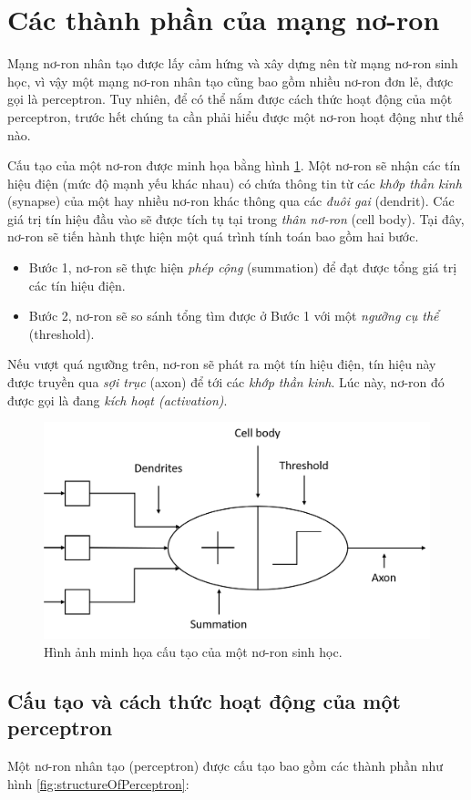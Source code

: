 \section{Các thành phần của mạng nơ-ron}
Mạng nơ-ron nhân tạo được lấy cảm hứng và xây dựng nên từ mạng nơ-ron sinh học, vì vậy một mạng nơ-ron nhân tạo cũng bao gồm nhiều nơ-ron đơn lẻ, được gọi là perceptron. Tuy nhiên, để có thể nắm được cách thức hoạt động của một perceptron, trước hết chúng ta cần phải hiểu được một nơ-ron hoạt động như thế nào.

Cấu tạo của một nơ-ron được minh họa bằng hình \ref{fig:structureOfNeuron}. Một nơ-ron sẽ nhận các tín hiệu điện (mức độ mạnh yếu khác nhau) có chứa thông tin từ các \textit{khớp thần kinh} (synapse) của một hay nhiều nơ-ron khác thông qua các \textit{đuôi gai} (dendrit). Các giá trị tín hiệu đầu vào sẽ được tích tụ tại trong \textit{thân nơ-ron} (cell body). Tại đây, nơ-ron sẽ tiến hành thực hiện một quá trình tính toán bao gồm hai bước.
\begin{itemize}
\item Bước 1, nơ-ron sẽ thực hiện \textit{phép cộng} (summation) để đạt được tổng giá trị các tín hiệu điện.
\item Bước 2, nơ-ron sẽ so sánh tổng tìm được ở Bước 1 với một \textit{ngưỡng cụ thể} (threshold).
\end{itemize}
Nếu vượt quá ngưỡng trên, nơ-ron sẽ phát ra một tín hiệu điện, tín hiệu này được truyền qua \textit{sợi trục} (axon) để tới các \textit{khớp thần kinh}. Lúc này, nơ-ron đó được gọi là đang \textit{kích hoạt (activation)}.

\begin{figure}[h!]
	\centering
		\includegraphics[width=0.5\columnwidth]{books/artificial-neural-network/chapter01/figure/Picture1.png}
		\centering
	\caption{Hình ảnh minh họa cấu tạo của một nơ-ron sinh học.}
	\label{fig:structureOfNeuron}
\end{figure}

\subsection{Cấu tạo và cách thức hoạt động của một perceptron}
Một nơ-ron nhân tạo (perceptron) được cấu tạo bao gồm các thành phần như hình \ref{fig:structureOfPerceptron}:

